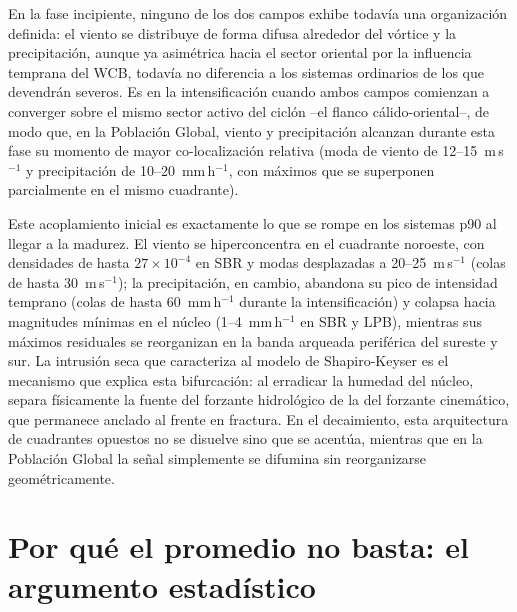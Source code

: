 En la fase incipiente, ninguno de los dos campos exhibe todavía una organización definida: el viento se distribuye de forma difusa alrededor del vórtice y la precipitación, aunque ya asimétrica hacia el sector oriental por la influencia temprana del WCB, todavía no diferencia a los sistemas ordinarios de los que devendrán severos. Es en la intensificación cuando ambos campos comienzan a converger sobre el mismo sector activo del ciclón --el flanco cálido-oriental--, de modo que, en la Población Global, viento y precipitación alcanzan durante esta fase su momento de mayor co-localización relativa (moda de viento de 12--15~m\,s$^{-1}$ y precipitación de 10--20~mm\,h$^{-1}$, con máximos que se superponen parcialmente en el mismo cuadrante).

Este acoplamiento inicial es exactamente lo que se rompe en los sistemas p90 al llegar a la madurez. El viento se hiperconcentra en el cuadrante noroeste, con densidades de hasta $27\times10^{-4}$ en SBR y modas desplazadas a 20--25~m\,s$^{-1}$ (colas de hasta 30~m\,s$^{-1}$); la precipitación, en cambio, abandona su pico de intensidad temprano (colas de hasta 60~mm\,h$^{-1}$ durante la intensificación) y colapsa hacia magnitudes mínimas en el núcleo (1--4~mm\,h$^{-1}$ en SBR y LPB), mientras sus máximos residuales se reorganizan en la banda arqueada periférica del sureste y sur. La intrusión seca que caracteriza al modelo de Shapiro-Keyser es el mecanismo que explica esta bifurcación: al erradicar la humedad del núcleo, separa físicamente la fuente del forzante hidrológico de la del forzante cinemático, que permanece anclado al frente en fractura. En el decaimiento, esta arquitectura de cuadrantes opuestos no se disuelve sino que se acentúa, mientras que en la Población Global la señal simplemente se difumina sin reorganizarse geométricamente.

\section{Por qué el promedio no basta: el argumento estadístico}

